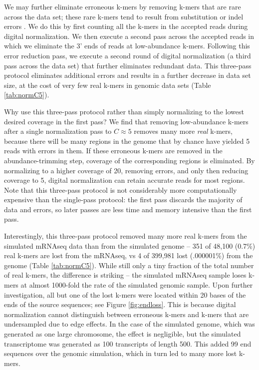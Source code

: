 \documentclass[10pt]{article}
\begin{document}
We may further eliminate erroneous k-mers by removing k-mers that are
rare across the data set; these rare k-mers tend to result from
substitution or indel errors \cite{pubmed21114842}.  We do this by
first counting all the k-mers in the accepted reads during digital
normalization.  We then execute a second pass across the accepted
reads in which we eliminate the 3' ends of reads at low-abundance
k-mers.  Following this error reduction pass, we execute a
second round of digital normalization (a third pass across the data
set) that further eliminates redundant data.  This three-pass protocol
eliminates additional errors and results in a further decrease in data
set size, at the cost of very few real k-mers in genomic data sets
(Table \ref{tab:normC5}).

Why use this three-pass protocol rather than simply normalizing to the
lowest desired coverage in the first pass?  We find that removing
low-abundance k-mers after a single normalization pass to $C \approx
5$ removes many more {\em real} k-mers, because there will be many
regions in the genome that by chance have yielded 5 reads with errors
in them. If these erroneous k-mers are removed in the abundance-trimming step,
coverage of the corresponding regions is eliminated.  By normalizing
to a higher coverage of 20, removing errors, and only then reducing
coverage to 5, digital normalization can retain accurate reads for most
regions.  Note that this three-pass protocol is not considerably more
computationally expensive than the single-pass protocol: the first
pass discards the majority of data and errors, so later passes are
less time and memory intensive than the first pass.

Interestingly, this three-pass protocol removed many more real k-mers
from the simulated mRNAseq data than from the simulated genome -- 351
of 48,100 (0.7\%) real k-mers are lost from the mRNAseq, vs 4 of
399,981 lost (.000001\%) from the genome (Table \ref{tab:normC5}).
While still only a tiny fraction of the total number of real k-mers,
the difference is striking -- the simulated mRNAseq sample loses k-mers
at almost 1000-fold the rate of the simulated genomic sample.  Upon
further investigation, all but one of the lost k-mers were located
within 20 bases of the ends of the source sequences; see Figure
\ref{fig:endloss}.  This is because digital normalization cannot
distinguish between erroneous k-mers and k-mers that are undersampled
due to edge effects.  In the case of the simulated genome, which was
generated as one large chromosome, the effect is negligible, but the
simulated transcriptome was generated as 100 transcripts of length
500.  This added 99 end sequences over the genomic simulation, which
in turn led to many more lost k-mers.
\end{document}
